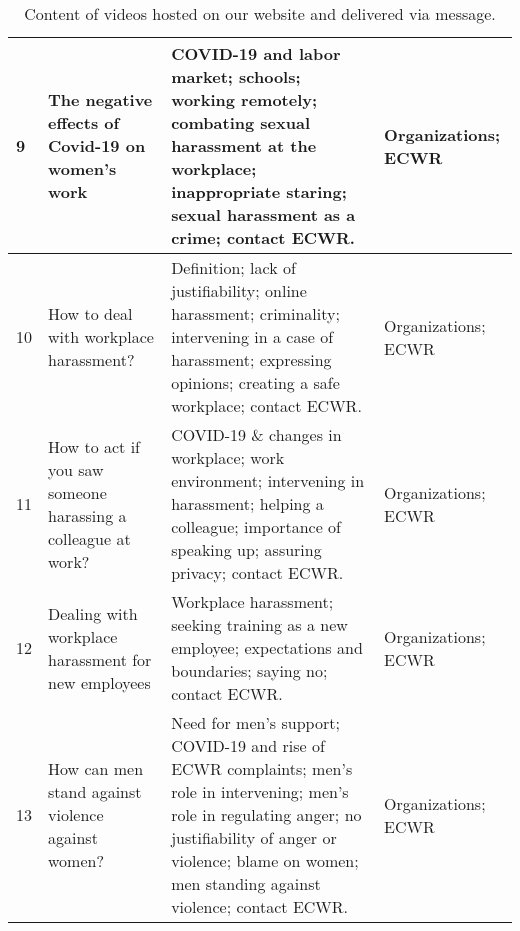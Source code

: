 \begin{table}[H]
{\begin{tabular}{|p{0.5cm}|p{4cm}|p{10cm}|p{3cm}|}
 9 & The negative effects of Covid-19 on women’s work & COVID-19 and labor market; schools; working remotely; combating sexual harassment at the workplace; inappropriate staring; sexual harassment as a crime; contact ECWR. & Organizations; ECWR  \\ \hline
 10 & How to deal with workplace harassment? & Definition; lack of justifiability; online harassment; criminality; intervening in a case of harassment; expressing opinions; creating a safe workplace; contact ECWR. & Organizations; ECWR  \\ \hline
 11 & How to act if you saw someone harassing a colleague at work? & COVID-19 \& changes in workplace; work environment; intervening in harassment; helping a colleague; importance of speaking up; assuring privacy; contact ECWR. & Organizations; ECWR  \\ \hline
 12 & Dealing with workplace harassment for new employees & Workplace harassment; seeking training as a new employee; expectations and boundaries; saying no; contact ECWR. & Organizations; ECWR \\ \hline
 13 & How can men stand against violence against women? & Need for men's support; COVID-19 and rise of ECWR complaints; men's role in intervening; men's role in regulating anger; no justifiability of anger or violence; blame on women; men standing against violence; contact ECWR.& Organizations; ECWR  \\ 
 \hline
\end{tabular}}
\caption{Content of videos hosted on our website and delivered via message.}
\label{table:website_content}
\end{table}
